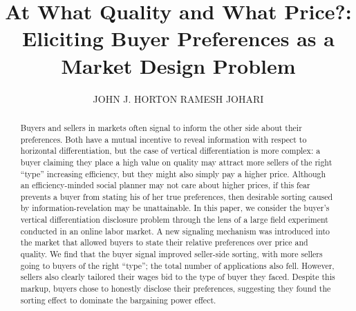 \documentclass[prodmode,acmec]{ec-acmsmall}
\begin{document}
 


\title{At What Quality and What Price?:\\Eliciting Buyer Preferences as a Market Design Problem}
\author{
JOHN J. HORTON
RAMESH JOHARI
}

\begin{abstract}
  \noindent  Buyers and sellers in markets often signal to inform the other side about their preferences.
  Both have a mutual incentive to reveal information with respect to horizontal differentiation, but the case of vertical differentiation is more complex:
  a buyer claiming they place a high value on quality may attract more sellers of the right ``type'' increasing efficiency, but they might also simply pay a higher price.
  Although an efficiency-minded social planner may not care about higher prices, if this fear prevents a buyer from stating his of her true preferences, then desirable sorting caused by information-revelation may be unattainable.
  In this paper, we consider the buyer's vertical differentiation disclosure problem through the lens of a large field experiment conducted in an online labor market. 
  A new signaling mechanism was introduced into the market that allowed buyers to state their relative preferences over price and quality.
  We find that the buyer signal improved seller-side sorting, with more sellers going to buyers of the right ``type''; the total number of applications also fell.
  However, sellers also clearly tailored their wages bid to the type of buyer they faced.
  Despite this markup, buyers chose to honestly disclose their preferences, suggesting they found the sorting effect to dominate the bargaining power effect.
\end{abstract} 



\end{document}
